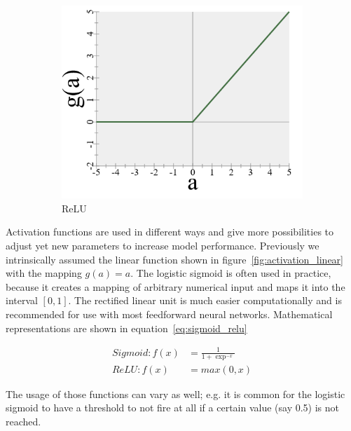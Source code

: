 \begin{figure}
    \begin{subfigure}[b]{0.3\textwidth}
        \includegraphics[width=\textwidth]{images/4_relu.png}
        \caption{ReLU}
        \label{fig:activation_relu}
    \end{subfigure}
    \caption{} %
\end{figure}

Activation functions are used in different ways and give more possibilities to adjust yet new parameters to increase model performance.
Previously we intrinsically assumed the linear function shown in figure~\ref{fig:activation_linear} with the mapping $g(a) = a$.
The logistic sigmoid is often used in practice, because it creates a mapping of arbitrary numerical input and maps it into the interval $[0,1]$.
The rectified linear unit is much easier computationally and is recommended for use with most feedforward neural networks\cite[p.169]{Goodfellow2017}\cite{Glorot2011}.
Mathematical representations are shown in equation~\eqref{eq:sigmoid_relu}

\begin{equation}
    \label{eq:sigmoid_relu}
    \begin{split}
        Sigmoid: f(x) & = \frac{1}{1 + \exp^{-x}} \\ ReLU: f(x) & = max(0, x)
    \end{split}
\end{equation}

The usage of those functions can vary as well; e.g. it is common for the logistic sigmoid to have a threshold to not fire at all if a certain value (say 0.5) is not reached.

